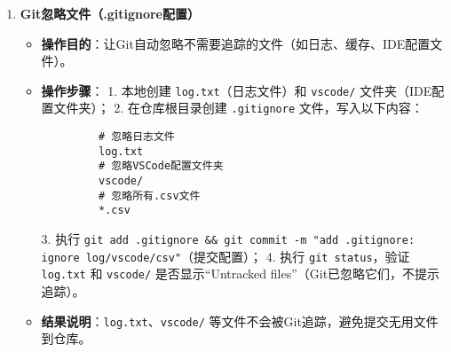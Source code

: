 \documentclass[a4paper]{article}
\begin{document}
\begin{enumerate}[itemsep=2\parskip, label=实例1.\arabic*]
\item \textbf{Git忽略文件（.gitignore配置）}
  \begin{itemize}[leftmargin=2em, itemsep=0.5\parskip]
    \item \textbf{操作目的}：让Git自动忽略不需要追踪的文件（如日志、缓存、IDE配置文件）。
    \item \textbf{操作步骤}：
      1. 本地创建 \texttt{log.txt}（日志文件）和 \texttt{vscode/} 文件夹（IDE配置文件夹）；
      2. 在仓库根目录创建 \texttt{.gitignore} 文件，写入以下内容：
         \begin{verbatim}
         # 忽略日志文件
         log.txt
         # 忽略VSCode配置文件夹
         vscode/
         # 忽略所有.csv文件
         *.csv
         \end{verbatim}
      3. 执行 \texttt{git add .gitignore \&\& git commit -m "add .gitignore: ignore log/vscode/csv"}（提交配置）；  %
      4. 执行 \texttt{git status}，验证 \texttt{log.txt} 和 \texttt{vscode/} 是否显示“Untracked files”（Git已忽略它们，不提示追踪）。
    \item \textbf{结果说明}：\texttt{log.txt}、\texttt{vscode/} 等文件不会被Git追踪，避免提交无用文件到仓库。
  \end{itemize}

\end{enumerate}
\end{document}
